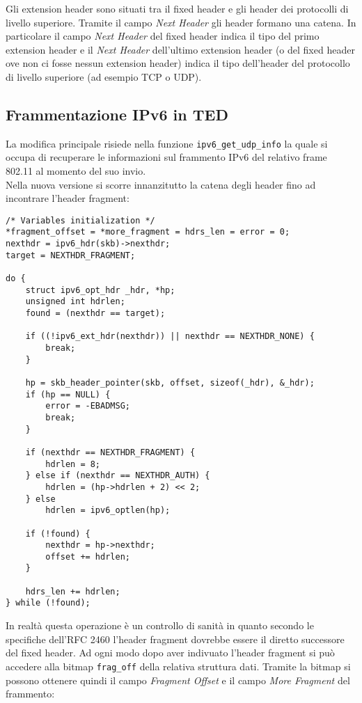 \documentclass[a4paper,10pt]{article}
\begin{document}
Gli extension header sono situati tra il fixed header e gli header dei
protocolli di livello superiore. Tramite il campo \emph{Next Header} gli header
formano una catena. In particolare il campo \emph{Next Header} del fixed
header indica il tipo del primo extension header e il \emph{Next Header}
dell'ultimo extension header (o del fixed header ove non ci fosse nessun
extension header) indica il tipo dell'header del protocollo di livello
superiore (ad esempio TCP o UDP).

\subsection{Frammentazione IPv6 in TED}
La modifica principale risiede nella funzione
\texttt{ipv6\_get\_udp\_info} la quale si occupa di recuperare le
informazioni sul frammento IPv6 del relativo frame 802.11
 al momento del suo invio.\\

Nella nuova versione si scorre innanzitutto la catena degli header fino
ad incontrare l'header fragment:
\begin{lstlisting}
/* Variables initialization */
*fragment_offset = *more_fragment = hdrs_len = error = 0;
nexthdr = ipv6_hdr(skb)->nexthdr;
target = NEXTHDR_FRAGMENT;

do {
	struct ipv6_opt_hdr _hdr, *hp;
	unsigned int hdrlen;
	found = (nexthdr == target);

	if ((!ipv6_ext_hdr(nexthdr)) || nexthdr == NEXTHDR_NONE) {
		break;
	}

	hp = skb_header_pointer(skb, offset, sizeof(_hdr), &_hdr);
	if (hp == NULL) {
		error = -EBADMSG;
		break;
	}

	if (nexthdr == NEXTHDR_FRAGMENT) {
		hdrlen = 8;
	} else if (nexthdr == NEXTHDR_AUTH) {
		hdrlen = (hp->hdrlen + 2) << 2;
	} else
		hdrlen = ipv6_optlen(hp);

	if (!found) {
		nexthdr = hp->nexthdr;
		offset += hdrlen;
	}

	hdrs_len += hdrlen;
} while (!found);
\end{lstlisting}

In realtà questa operazione è un
controllo di sanità in quanto secondo le specifiche dell'RFC 2460 %
l'header fragment
dovrebbe essere il diretto successore del fixed header. 
Ad ogni modo dopo aver indivuato l'header fragment si può accedere alla
bitmap \texttt{frag\_off} della relativa struttura dati. Tramite la
bitmap si possono ottenere quindi il campo \emph{Fragment Offset} e il
campo \emph{More
Fragment} del frammento:
\end{document}
